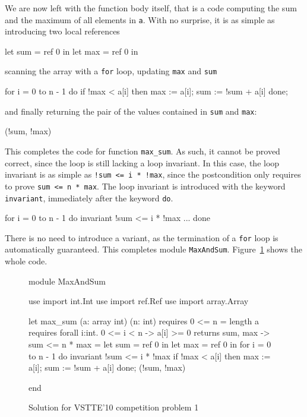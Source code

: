 We are now left with the function body itself, that is a code
computing the sum and the maximum of all elements in \texttt{a}. With
no surprise, it is as simple as introducing two local references
\begin{whycode}
    let sum = ref 0 in
    let max = ref 0 in
\end{whycode}
scanning the array with a \texttt{for} loop, updating \texttt{max}
and \texttt{sum}
\begin{whycode}
    for i = 0 to n - 1 do
      if !max < a[i] then max := a[i];
      sum := !sum + a[i]
    done;
\end{whycode}
and finally returning the pair of the values contained in \texttt{sum}
and \texttt{max}:
\begin{whycode}
  (!sum, !max)
\end{whycode}
This completes the code for function \texttt{max\_sum}.
As such, it cannot be proved correct, since the loop is still lacking
a loop invariant. In this case, the loop invariant is as simple as
\verb|!sum <= i * !max|, since the postcondition only requires to prove
\verb|sum <= n * max|. The loop invariant is introduced with the
keyword \texttt{invariant}, immediately after the keyword \texttt{do}.
\begin{whycode}
    for i = 0 to n - 1 do
      invariant { !sum <= i * !max }
      ...
    done
\end{whycode}
There is no need to introduce a variant, as the termination of a
\texttt{for} loop is automatically guaranteed.
This completes module \texttt{MaxAndSum}.
Figure~\ref{fig:MaxAndSum} shows the whole code.
\begin{figure}
  \centering
\begin{whycode}
module MaxAndSum

  use import int.Int
  use import ref.Ref
  use import array.Array

  let max_sum (a: array int) (n: int)
    requires { 0 <= n = length a }
    requires { forall i:int. 0 <= i < n -> a[i] >= 0 }
    returns  { sum, max -> sum <= n * max }
  = let sum = ref 0 in
    let max = ref 0 in
    for i = 0 to n - 1 do
      invariant { !sum <= i * !max }
      if !max < a[i] then max := a[i];
      sum := !sum + a[i]
    done;
    (!sum, !max)

end
\end{whycode}
\vspace*{-1em}%
  \caption{Solution for VSTTE'10 competition problem 1}
  \label{fig:MaxAndSum}
\end{figure}
